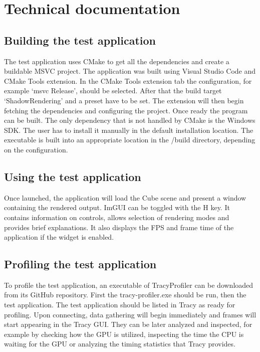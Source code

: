 \chapter{Technical documentation}

\section{Building the test application}
The test application uses CMake to get all the dependencies and create a buildable MSVC project. The application was built using Visual Studio Code and CMake Tools extension. In the CMake Tools extension tab the configuration, for example `msvc Release', should be selected. After that the build target `ShadowRendering' and a preset have to be set. The extension will then begin fetching the dependencies and configuring the project. Once ready the program can be built. The only dependency that is not handled by CMake is the Windows SDK. The user has to install it manually in the default installation location. The executable is built into an appropriate location in the /build directory, depending on the configuration.

\section{Using the test application}
Once launched, the application will load the Cube scene and present a window containing the rendered output. ImGUI can be toggled with the H key. It contains information on controls, allows selection of rendering modes and provides brief explanations. It also displays the FPS and frame time of the application if the widget is enabled.

\section{Profiling the test application}
To profile the test application, an executable of TracyProfiler can be downloaded from its GitHub repository. First the tracy-profiler.exe should be run, then the test application. The test application should be listed in Tracy as ready for profiling. Upon connecting, data gathering will begin immediately and frames will start appearing in the Tracy GUI. They can be later analyzed and inspected, for example by checking how the GPU is utilized, inspecting the time the CPU is waiting for the GPU or analyzing the timing statistics that Tracy provides.